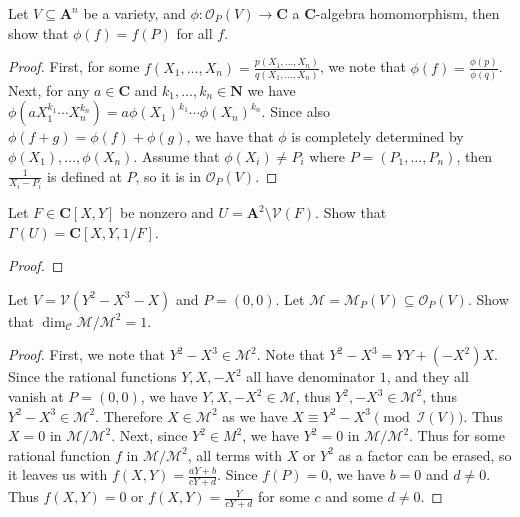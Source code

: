 \documentclass[11pt]{book}
\begin{document}
\begin{problem}
Let $V\subseteq\mathbf A^n$ be a variety, and $\phi:\mathcal{O}_P(V)\rightarrow \mathbf C$ a $\mathbf C$-algebra homomorphism, then show that $\phi(f)=f(P)$ for all $f$.
\begin{proof}
First, for some $f(X_1,\dots,X_n)=\frac{p(X_1,\dots,X_n)}{q(X_1,\dots,X_n)}$, we note that $\phi(f)=\frac{\phi(p)}{\phi(q)}$. Next, for any $a\in\mathbf C$ and $k_1,\dots,k_n\in\mathbf N$ we have $\phi(aX_1^{k_1}\cdots X_n^{k_n})=a\phi(X_1)^{k_1}\cdots\phi(X_n)^{k_n}$. Since also $\phi(f+g)=\phi(f)+\phi(g)$, we have that $\phi$ is completely determined by $\phi(X_1),\dots,\phi(X_n)$. Assume that $\phi(X_i)\ne P_i$ where $P=(P_1,\dots,P_n)$, then $\frac{1}{X_i-P_i}$ is defined at $P$, so it is in $\mathcal{O}_P(V)$.

\end{proof}
\end{problem}
\begin{problem}
Let $F\in\mathbf C[X,Y]$ be nonzero and $U=\mathbf A^2\setminus \mathcal{V}(F)$. Show that $\Gamma(U)=\mathbf C[X,Y,1/F]$.
\begin{proof}

\end{proof}
\end{problem}
\begin{problem}
Let $V=\mathcal{V}(Y^2-X^3-X)$ and $P=(0,0)$. Let $\mathcal M=\mathcal{M}_P(V)\subseteq\mathcal{O}_P(V)$. Show that $\dim_{\mathcal C}\mathcal{M}/\mathcal{M}^2=1$.
\begin{proof}
First, we note that $Y^2-X^3\in\mathcal{M}^2$. Note that $Y^2-X^3=YY+(-X^2)X$. Since the rational functions $Y,X,-X^2$ all have denominator $1$, and they all vanish at $P=(0,0)$, we have $Y,X,-X^2\in\mathcal{M}$, thus $Y^2,-X^3\in\mathcal{M}^2$, thus $Y^2-X^3\in\mathcal{M}^2$. Therefore $X\in \mathcal{M}^2$ as we have $X\equiv Y^2-X^3\pmod{\mathcal I(V)}$. Thus $X=0$ in $\mathcal{M}/\mathcal{M}^2$. Next, since $Y^2\in M^2$, we have $Y^2=0$ in $\mathcal{M}/\mathcal{M}^2$.  Thus for some rational function $f$ in $\mathcal{M}/\mathcal{M}^2$, all terms with $X$ or $Y^2$ as a factor can be erased, so it leaves us with $f(X,Y)=\frac{aY+b}{cY+d}$. Since $f(P)=0$, we have $b=0$ and $d\ne 0$. Thus $f(X,Y)=0$ or $f(X,Y)=\frac{Y}{cY+d}$ for some $c$ and some $d\ne 0$.
\end{proof}
\end{problem}
\end{document}
